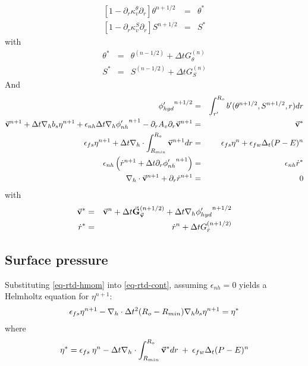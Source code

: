 \begin{eqnarray*}
\left[ 1 - \partial_r \kappa_v^\theta \partial_r \right]
\theta^{n+1/2} & = & \theta^*
\\
\left[ 1 - \partial_r \kappa_v^S \partial_r \right]
S^{n+1/2} & = & S^*
\end{eqnarray*}
with
\begin{eqnarray*}
\theta^* & = &
\theta ^{(n-1/2)} + \Delta t G_{\theta} ^{(n)}
\\
S^* & = &
S ^{(n-1/2)} + \Delta t G_{S} ^{(n)}
\end{eqnarray*}
And 
\begin{eqnarray*}
{\phi'_{hyd}}^{n+1/2} & = & \int_{r'}^{R_o} b'(\theta^{n+1/2},S^{n+1/2},r) dr
\\
\vec{\bf v} ^{n+1}
+ \Delta t {\bf \nabla}_h b_s {\eta}^{n+1}
+ \epsilon_{nh} \Delta t {\bf \nabla}_h {\phi'_{nh}}^{n+1}
- \partial_r A_v \partial_r \vec{\bf v}^{n+1}
& = &
\vec{\bf v}^*
\\
\epsilon_{fs} {\eta}^{n+1} + \Delta t
{\bf \nabla}_h \cdot \int_{R_{min}}^{R_o} \vec{\bf v}^{n+1} dr
& = & 
\epsilon_{fs} {\eta}^{n} + \epsilon_{fw} \Delta_t (P-E)^{n} 
\\
\epsilon_{nh} \left( \dot{r} ^{n+1}
+ \Delta t \partial_r {\phi'_{nh}} ^{n+1}
\right)
& = & \epsilon_{nh} \dot{r}^*
\\
{\bf \nabla}_h \cdot \vec{\bf v}^{n+1} + \partial_r \dot{r}^{n+1}
& = & 0
\end{eqnarray*}
with
\begin{eqnarray*}
\vec{\bf v}^* & = &
\vec{\bf v} ^{n} + \Delta t \vec{\bf G}_{\vec{\bf v}} ^{(n+1/2)}
+ \Delta t  {\bf \nabla}_h {\phi'_{hyd}}^{n+1/2}
\\
\dot{r}^* & = &
\dot{r} ^{n} + \Delta t G_{\dot{r}} ^{(n+1/2)}
\end{eqnarray*}


\subsection{Surface pressure}

Substituting \ref{eq-rtd-hmom} into \ref{eq-rtd-cont}, assuming
$\epsilon_{nh} = 0$ yields a Helmholtz equation for ${\eta}^{n+1}$:
\begin{eqnarray}
\epsilon_{fs} {\eta}^{n+1} -
{\bf \nabla}_h \cdot \Delta t^2 (R_o-R_{min})
{\bf \nabla}_h b_s {\eta}^{n+1}
= {\eta}^*
\label{solve_2d}
\end{eqnarray}
where
\begin{eqnarray}
{\eta}^* = \epsilon_{fs} \: {\eta}^{n} -
\Delta t {\bf \nabla}_h \cdot \int_{R_{min}}^{R_o} \vec{\bf v}^* dr
\: + \: \epsilon_{fw} \Delta_t (P-E)^{n} 
\label{solve_2d_rhs}
\end{eqnarray}

